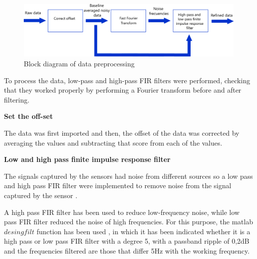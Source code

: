 \documentclass[12pt, a4paper]{article} %
\begin{document}
\setlength{\parskip}{4mm}

\begin{figure}[htbp]
	\centering
	\includegraphics[width=1\textwidth]{figures/esquema_preprocesado_metodos_1.png}
	\caption{Block diagram of data preprocessing}
	\label{fig:esquema_preprocesado}
\end{figure}

To process the data, low-pass and high-pass FIR filters were performed, checking that they worked properly by performing a Fourier transform before and after filtering. 

\setlength{\parskip}{8mm}
\setlength{\parindent}{0pt}

\newpage

\textbf{Set the off-set}
\setlength{\parskip}{0mm}

The data was first imported and then, the offset of the data was corrected by averaging the values and subtracting that score from each of the values. 

\setlength{\parindent}{8pt}
\setlength{\parskip}{4mm}

\setlength{\parindent}{0pt}
\setlength{\parskip}{8mm}
\textbf{Low and high pass finite impulse response filter}
\setlength{\parskip}{0mm}

The signals captured by the sensors had noise from different sources so a low pass and high pass FIR filter were implemented to remove noise from the signal captured by the sensor \cite{mondal2012novel}. 

\setlength{\parskip}{4mm}
\setlength{\parindent}{8pt}

A high pass FIR filter has been used to reduce low-frequency noise, while low pass FIR filter reduced the noise of high frequencies. For this purpose, the matlab $desingfilt$ function has been used \cite{jacob2015digital}, in which it has been indicated whether it is a high pass or low pass FIR filter with a degree 5, with a passband ripple of 0,2dB and the frequencies filtered are those that differ 5Hz with the working frequency.
\end{document}
